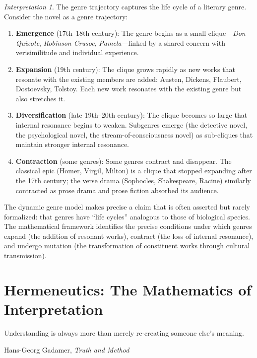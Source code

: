 \documentclass[11pt,openany]{book}
\theoremstyle{definition}
\theoremstyle{plain}
\theoremstyle{remark}
\newtheorem{interpretation}[axiom]{Interpretation}
\begin{document}
\begin{interpretation}
The genre trajectory captures the life cycle of a literary genre. Consider the novel as a genre trajectory:
\begin{enumerate}
\item \textbf{Emergence} (17th--18th century): The genre begins as a small clique---\emph{Don Quixote}, \emph{Robinson Crusoe}, \emph{Pamela}---linked by a shared concern with verisimilitude and individual experience.
\item \textbf{Expansion} (19th century): The clique grows rapidly as new works that resonate with the existing members are added: Austen, Dickens, Flaubert, Dostoevsky, Tolstoy. Each new work resonates with the existing genre but also stretches it.
\item \textbf{Diversification} (late 19th--20th century): The clique becomes so large that internal resonance begins to weaken. Subgenres emerge (the detective novel, the psychological novel, the stream-of-consciousness novel) as sub-cliques that maintain stronger internal resonance.
\item \textbf{Contraction} (some genres): Some genres contract and disappear. The classical epic (Homer, Virgil, Milton) is a clique that stopped expanding after the 17th century; the verse drama (Sophocles, Shakespeare, Racine) similarly contracted as prose drama and prose fiction absorbed its audience.
\end{enumerate}

The dynamic genre model makes precise a claim that is often asserted but rarely formalized: that genres have ``life cycles'' analogous to those of biological species. The mathematical framework identifies the precise conditions under which genres expand (the addition of resonant works), contract (the loss of internal resonance), and undergo mutation (the transformation of constituent works through cultural transmission).
\end{interpretation}

\chapter{Hermeneutics: The Mathematics of Interpretation}
\label{ch:hermeneutics}

\epigraph{Understanding is always more than merely re-creating someone else's meaning.}{Hans-Georg Gadamer, \textit{Truth and Method}}
\end{document}
